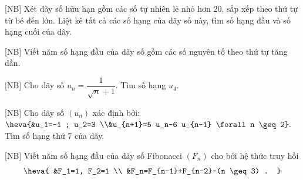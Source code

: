 \begin{bt}%
[NB]%
	Xét dãy số hữu hạn gồm các số tự nhiên lẻ nhỏ hơn 20, sắp xếp theo thứ tự từ bé đến lớn. Liệt kê tất cả các số hạng của dãy số này, tìm số hạng đầu và số hạng cuối của dãy. 
\end{bt}

\begin{bt}%
[NB]%
	Viết năm số hạng đầu của dãy số gồm các số nguyên tố theo thứ tự tăng dần.
\end{bt}

\begin{bt}%
[NB]
	Cho dãy số $u_n=\dfrac{1}{\sqrt{n}+1}$. Tìm số hạng $u_4$.	
\end{bt}

\begin{bt}%
[NB]
	Cho dãy số $(u_n)$ xác định bởi: $\heva{&u_1=-1 ; u_2=3 \\&u_{n+1}=5 u_n-6 u_{n-1} \forall n \geq 2}.$ Tìm số hạng thứ $7$ của dãy.
\end{bt}

\begin{bt}%
[NB]
	Viết năm số hạng đầu của dãy số Fibonacci $\left(F_n\right)$ cho bởi hệ thức truy hồi
	$$
	\heva{
		&F_1=1, F_2=1 \\
		&F_n=F_{n-1}+F_{n-2}~(n \geq 3) .
	}
	$$
\end{bt}

